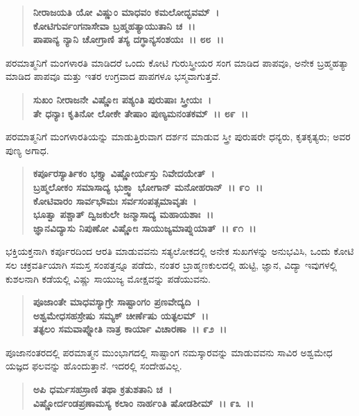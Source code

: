 \begin{verse}
\textbf{ನೀರಾಜಯತಿ ಯೋ ವಿಷ್ಣುಂ ಮಾಧವಂ ಕಮಲೋದ್ಭವಮ್~।}\\\textbf{ಕೋಟಿಗುರ್ವಂಗನಾಸೇವಾ ಬ್ರಹ್ಮಹತ್ಯಾಯುತಾನಿ ಚ~।।}\\\textbf{ಪಾಪಾನ್ಯ ನ್ಯಾನಿ ಚೋಗ್ರಾಣಿ ತಸ್ಯ ದಗ್ಧಾನ್ಯಸಂಶಯಃ~।। ೮೮~।।}
\end{verse}

ಪರಮಾತ್ಮನಿಗೆ ಮಂಗಳಾರತಿ ಮಾಡಿದರೆ ಒಂದು ಕೋಟಿ ಗುರುಸ್ತ್ರೀಯರ ಸಂಗ ಮಾಡಿದ ಪಾಪವೂ, ಅನೇಕ ಬ್ರಹ್ಮಹತ್ಯಾ ಮಾಡಿದ ಪಾಪವೂ ಮತ್ತು ಇತರ ಉಗ್ರವಾದ ಪಾಪಗಳೂ ಭಸ್ಮವಾಗುತ್ತವೆ.

\begin{verse}
\textbf{ಸುಖಂ ನೀರಾಜನೇ ವಿಷ್ಣೋಃ ಪಶ್ಯಂತಿ ಪುರುಷಾಃ ಸ್ತ್ರೀಯಃ~।}\\\textbf{ತೇ ಧನ್ಯಾಃ ಕೃತಿನೋ ಲೋಕೇ ತೇಷಾಂ ಪುಣ್ಯಮನಂತಕಮ್~।। ೮೯~।।}
\end{verse}

ಪರಮಾತ್ಮನಿಗೆ ಮಂಗಳಾರತಿಯನ್ನು ಮಾಡುತ್ತಿರುವಾಗ ದರ್ಶನ ಮಾಡುವ ಸ್ತ್ರೀ ಪುರುಷರೇ ಧನ್ಯರು, ಕೃತಕೃತ್ಯರು; ಅವರ ಪುಣ್ಯ ಅಗಾಧ.

\begin{verse}
\textbf{ಕರ್ಪೂರಸ್ಯಾರ್ತಿಕಂ ಭಕ್ತ್ಯಾ ವಿಷ್ಣೋರ್ಯಸ್ತು ನಿವೇದಯೇತ್~।}\\\textbf{ಬ್ರಹ್ಮಲೋಕಂ ಸಮಾಸಾದ್ಯ ಭುಕ್ತ್ವಾ ಭೋಗಾನ್ ಮನೋಹರಾನ್~।। ೯೦~।। }\\\textbf{ಕೋಟಿವಾರಂ ಸಾರ್ವಭೌಮಃ ಸರ್ವಸಂಪತ್ಸಮಾವೃತಃ~।}\\\textbf{ಭೂತ್ವಾ ಪಶ್ಚಾತ್ ದ್ವಿಜಕುಲೇ ಜನ್ಮಾಸಾದ್ಯ ಮಹಾಯಶಾಃ~।।} \\\textbf{ಜ್ಞಾನವಿದ್ಯಾಸು ನಿಪುಣೋ ವಿಷ್ಣೋಃ ಸಾಯುಜ್ಯಮಾಪ್ನುಯಾತ್~।। ೯೧~।।}
\end{verse}

ಭಕ್ತಿಯಕ್ತನಾಗಿ ಕರ್ಪೂರದಿಂದ ಆರತಿ ಮಾಡುವವನು ಸತ್ಯಲೋಕದಲ್ಲಿ ಅನೇಕ ಸುಖಗಳನ್ನು ಅನುಭವಿಸಿ, ಒಂದು ಕೋಟಿ ಸಲ ಚಕ್ರವರ್ತಿಯಾಗಿ ಸಮಸ್ತ ಸಂಪತ್ತನ್ನೂ ಪಡೆದು, ನಂತರ ಬ್ರಾಹ್ಮಣಕುಲದಲ್ಲಿ ಹುಟ್ಟಿ, ಜ್ಞಾನ, ವಿದ್ಯಾ ಇವುಗಳಲ್ಲಿ ಕುಶಲನಾಗಿ ಕಡೆಯಲ್ಲಿ ವಿಷ್ಣು ಸಾಯುಜ್ಯ ಮೋಕ್ಷವನ್ನು ಪಡೆಯುವನು.

\begin{verse}
\textbf{ಪೂಜಾಂತೇ ಮಾಧವಸ್ಯಾಗ್ರೇ ಸಾಷ್ಟಾಂಗಂ ಪ್ರಣವೇದ್ಯದಿ~।}\\\textbf{ಅಶ್ವಮೇಧಸಹಸ್ರೇಷು ಸಮ್ಯಕ್ ಚೀರ್ಣೆಷು ಯತ್ಫಲಮ್~।।}\\\textbf{ತತ್ಫಲಂ ಸಮವಾಪ್ನೋತಿ ನಾತ್ರ ಕಾರ್ಯಾ ವಿಚಾರಣಾ~।। ೯೨~।।}
\end{verse}

ಪೂಜಾನಂತರದಲ್ಲಿ ಪರಮಾತ್ಮನ ಮುಂಭಾಗದಲ್ಲಿ ಸಾಷ್ಟಾಂಗ ನಮಸ್ಕಾರವನ್ನು ಮಾಡುವವನು ಸಾವಿರ ಅಶ್ವಮೇಧ ಯಜ್ಞದ ಫಲವನ್ನು ಹೊಂದುತ್ತಾನೆ. ಇದರಲ್ಲಿ ಸಂದೇಹವಿಲ್ಲ.

\begin{verse}
\textbf{ಅಪಿ ಧರ್ಮಸಹಸ್ರಾಣಿ ತಥಾ ಕ್ರತುಶತಾನಿ ಚ~।}\\\textbf{ವಿಷ್ಣೋರ್ದಂಡಪ್ರಣಾಮಸ್ಯ ಕಲಾಂ ನಾರ್ಹಂತಿ ಷೋಡಶೀಮ್~।। ೯೩~।।}
\end{verse}

